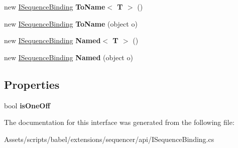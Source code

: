 \begin{DoxyCompactItemize}
\item 
\hypertarget{interfacebabel_1_1extensions_1_1sequencer_1_1api_1_1_i_sequence_binding_a55a1a691728547a1c63d4127719ce1f2}{new \hyperlink{interfacebabel_1_1extensions_1_1sequencer_1_1api_1_1_i_sequence_binding}{I\-Sequence\-Binding} {\bfseries To\-Name$<$ T $>$} ()}\label{interfacebabel_1_1extensions_1_1sequencer_1_1api_1_1_i_sequence_binding_a55a1a691728547a1c63d4127719ce1f2}

\item 
\hypertarget{interfacebabel_1_1extensions_1_1sequencer_1_1api_1_1_i_sequence_binding_ae4f252ba42bbc6fbedaa6803a34954b2}{new \hyperlink{interfacebabel_1_1extensions_1_1sequencer_1_1api_1_1_i_sequence_binding}{I\-Sequence\-Binding} {\bfseries To\-Name} (object o)}\label{interfacebabel_1_1extensions_1_1sequencer_1_1api_1_1_i_sequence_binding_ae4f252ba42bbc6fbedaa6803a34954b2}

\item 
\hypertarget{interfacebabel_1_1extensions_1_1sequencer_1_1api_1_1_i_sequence_binding_a0b3b2786975c2fcc7ac5f85dbfddae21}{new \hyperlink{interfacebabel_1_1extensions_1_1sequencer_1_1api_1_1_i_sequence_binding}{I\-Sequence\-Binding} {\bfseries Named$<$ T $>$} ()}\label{interfacebabel_1_1extensions_1_1sequencer_1_1api_1_1_i_sequence_binding_a0b3b2786975c2fcc7ac5f85dbfddae21}

\item 
\hypertarget{interfacebabel_1_1extensions_1_1sequencer_1_1api_1_1_i_sequence_binding_abd3ad1133db4c235c751f5165d39d283}{new \hyperlink{interfacebabel_1_1extensions_1_1sequencer_1_1api_1_1_i_sequence_binding}{I\-Sequence\-Binding} {\bfseries Named} (object o)}\label{interfacebabel_1_1extensions_1_1sequencer_1_1api_1_1_i_sequence_binding_abd3ad1133db4c235c751f5165d39d283}

\end{DoxyCompactItemize}
\subsection*{Properties}
\begin{DoxyCompactItemize}
\item 
\hypertarget{interfacebabel_1_1extensions_1_1sequencer_1_1api_1_1_i_sequence_binding_a52ae3c2a1cf4fbb858fd71672a0a2a98}{bool {\bfseries is\-One\-Off}}\label{interfacebabel_1_1extensions_1_1sequencer_1_1api_1_1_i_sequence_binding_a52ae3c2a1cf4fbb858fd71672a0a2a98}

\end{DoxyCompactItemize}


The documentation for this interface was generated from the following file\-:\begin{DoxyCompactItemize}
\item 
Assets/scripts/babel/extensions/sequencer/api/I\-Sequence\-Binding.\-cs\end{DoxyCompactItemize}
